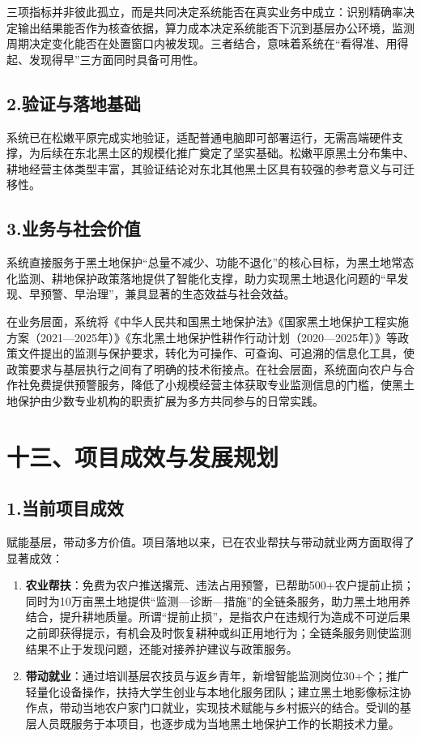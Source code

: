 \documentclass[12pt, a4paper]{ctexart}
\begin{document}
三项指标并非彼此孤立，而是共同决定系统能否在真实业务中成立：识别精确率决定输出结果能否作为核查依据，算力成本决定系统能否下沉到基层办公环境，监测周期决定变化能否在处置窗口内被发现。三者结合，意味着系统在“看得准、用得起、发现得早”三方面同时具备可用性。

\subsection{2.验证与落地基础}

系统已在松嫩平原完成实地验证，适配普通电脑即可部署运行，无需高端硬件支撑，为后续在东北黑土区的规模化推广奠定了坚实基础。松嫩平原黑土分布集中、耕地经营主体类型丰富，其验证结论对东北其他黑土区具有较强的参考意义与可迁移性。

\subsection{3.业务与社会价值}

系统直接服务于黑土地保护“总量不减少、功能不退化”的核心目标，为黑土地常态化监测、耕地保护政策落地提供了智能化支撑，助力实现黑土地退化问题的“早发现、早预警、早治理”，兼具显著的生态效益与社会效益。

在业务层面，系统将《中华人民共和国黑土地保护法》《国家黑土地保护工程实施方案（2021—2025年）》《东北黑土地保护性耕作行动计划（2020—2025年）》等政策文件提出的监测与保护要求，转化为可操作、可查询、可追溯的信息化工具，使政策要求与基层执行之间有了明确的技术衔接点。在社会层面，系统面向农户与合作社免费提供预警服务，降低了小规模经营主体获取专业监测信息的门槛，使黑土地保护由少数专业机构的职责扩展为多方共同参与的日常实践。

\section{十三、项目成效与发展规划}

\subsection{1.当前项目成效}

赋能基层，带动多方价值。项目落地以来，已在农业帮扶与带动就业两方面取得了显著成效：

\begin{enumerate}
  \item \textbf{农业帮扶}：免费为农户推送撂荒、违法占用预警，已帮助500+农户提前止损；同时为10万亩黑土地提供“监测—诊断—措施”的全链条服务，助力黑土地用养结合，提升耕地质量。所谓“提前止损”，是指农户在违规行为造成不可逆后果之前即获得提示，有机会及时恢复耕种或纠正用地行为；全链条服务则使监测结果不止于发现问题，还能对接养护建议与政策服务。
  \item \textbf{带动就业}：通过培训基层农技员与返乡青年，新增智能监测岗位30+个；推广轻量化设备操作，扶持大学生创业与本地化服务团队；建立黑土地影像标注协作点，带动当地农户家门口就业，实现技术赋能与乡村振兴的结合。受训的基层人员既服务于本项目，也逐步成为当地黑土地保护工作的长期技术力量。
\end{enumerate}
\end{document}
